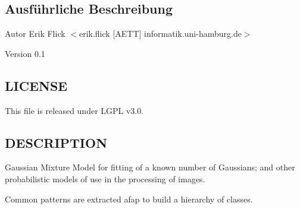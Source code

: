 \subsection{Ausführliche Beschreibung}
\begin{DoxyAuthor}{Autor}
Erik Flick $<$erik.flick \mbox{[}AETT\mbox{]} informatik.uni-\/hamburg.de$>$ 
\end{DoxyAuthor}
\begin{DoxyVersion}{Version}
0.1
\end{DoxyVersion}
\hypertarget{ProbabilisticClustering_8c_09_09_LICENSE}{}\subsection{LICENSE}\label{ProbabilisticClustering_8c_09_09_LICENSE}
This file is released under LGPL v3.0.\hypertarget{ProbabilisticClustering_8h_09_09_DESCRIPTION}{}\subsection{DESCRIPTION}\label{ProbabilisticClustering_8h_09_09_DESCRIPTION}
Gaussian Mixture Model for fitting of a known number of Gaussians; and other probabilistic models of use in the processing of images.

Common patterns are extracted afap to build a hierarchy of classes. 